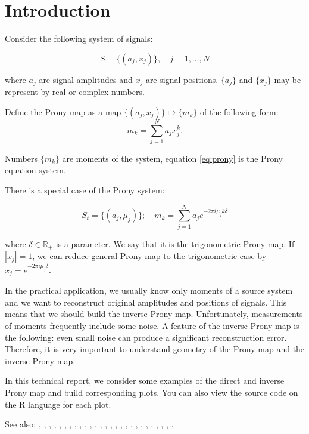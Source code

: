 \section{Introduction}

Consider the following system of signals:

$$
  S = \{ (a_j, x_j) \}, \quad j = 1, \ldots , N
$$

where $a_j$ are signal amplitudes and $x_j$ are signal positions. $\{a_j\}$ and $\{x_j\}$ may be represent by real or complex numbers. \par

Define the Prony map as a map $\{ (a_j, x_j) \} \mapsto \{m_k\}$ of the following form:
$$
  \label{eq:prony}
  m_k = \sum_{j=1}^N a_j x_j^k.
$$
  
Numbers $\{m_k\}$ are moments of the system, equation \eqref{eq:prony} is the Prony equation system.

There is a special case of the Prony system:

$$
  S_t = \{ (a_j, \mu_j) \}; \quad m_k = \sum_{j=1}^N a_j e^{-2\pi i \mu_j k \delta}
$$

where $\delta \in \mathbb{R}_+$ is a parameter. We say that it is the trigonometric Prony map. If $|x_j| = 1$, we can reduce general Prony map to the trigonometric case by $x_j = e^{-2\pi i \mu_j \delta}$.

In the practical application, we usually know only moments of a source system and we want to reconstruct original amplitudes and positions of signals. This means that we should build the inverse Prony map. Unfortunately, measurements of moments frequently include some noise. A feature of the inverse Prony map is the following: even small noise can produce a significant reconstruction error. Therefore, it is very important to understand geometry of the Prony map and the inverse Prony map.

In this technical report, we consider some examples of the direct and inverse Prony map and build corresponding plots. You can also view the source code on the R language for each plot.

See also: \cite{2015arXiv150206932A}, \cite{azais_spike}, \cite{batenkov_numerical_2014}, \cite{batenkov_accurate_2014}, \cite{Bat.Sar.Yom}, \cite{Bat.Yom2}, \cite{Bat.Yom.Sampta13}, \cite{Bat.Yom1}, \cite{candes_towards_2014}, \cite{candes_super-resolution_2013}, \cite{demanet_super-resolution_2013}, \cite{donoho_superresolution_1992}, \cite{Don1}, \cite{duval_exact_2013}, \cite{fernandez-granda_support_2013}, \cite{heckel_super-resolution_2014}, \cite{Lev.Ful}, \cite{liao_music_2014}, \cite{McC}, \cite{Min.Kaw.Min}, \cite{moitra_threshold_2014}, \cite{Ode.Bar.Pis}, \cite{Sle}, \cite{Yom2}, \cite{Yom1}, \cite{Dem.Ngu}, \cite{Mor.Can}.